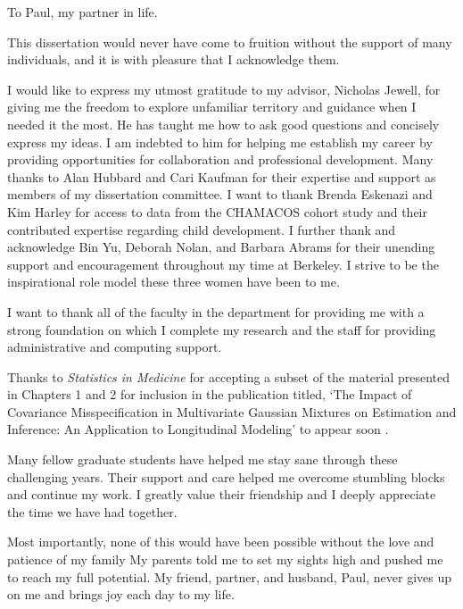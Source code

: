 \documentclass{ucbthesis}
\begin{document}
\begin{frontmatter}

\begin{dedication}
\null\vfil
\begin{center}
To Paul, my partner in life.\\\vspace{12pt}

\end{center}
\vfil\null
\end{dedication}

\begin{KeepFromToc}
  \tableofcontents
\end{KeepFromToc}

\clearpage
\listoffigures
\clearpage
\listoftables

\begin{acknowledgements}
This dissertation would never have come to fruition without the support of many individuals, and it is with pleasure that I acknowledge them.

I would like to express my utmost gratitude to my advisor, Nicholas Jewell, for giving me the freedom to explore unfamiliar territory and guidance when I needed it the most. He has taught me how to ask good questions and concisely express my ideas. I am indebted to him for helping me establish my career by providing opportunities for collaboration and professional development. Many thanks to Alan Hubbard and Cari Kaufman for their expertise and support as members of my dissertation committee. I want to thank Brenda Eskenazi and Kim Harley for access to data from the CHAMACOS cohort study and their contributed expertise regarding child development. I further thank and acknowledge Bin Yu, Deborah Nolan, and Barbara Abrams for their unending support and encouragement throughout my time at Berkeley. I strive to be the inspirational role model these three women have been to me.

I want to thank all of the faculty in the department for providing me with a strong foundation on which I complete my research and the staff for providing administrative and computing support. 

Thanks to \emph{Statistics in Medicine} for accepting a subset of the material presented in Chapters 1 and 2 for inclusion in the publication titled, `The Impact of Covariance Misspecification in Multivariate Gaussian Mixtures on Estimation and Inference: An Application to Longitudinal Modeling' to appear soon \cite{heggeseth2013}. 

Many fellow graduate students have helped me stay sane through these challenging years. Their support and care helped me overcome stumbling blocks and continue my work. I greatly value their friendship and I deeply appreciate the time we have had together.

Most importantly, none of this would have been possible without the love and patience of my family My parents told me to set my sights high and pushed me to reach my full potential. My friend, partner, and husband, Paul, never gives up on me and brings joy each day to my life.
\end{acknowledgements}

\end{frontmatter}
\end{document}
